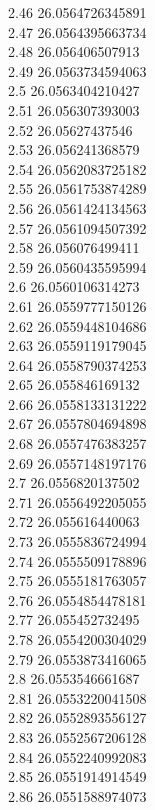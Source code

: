{2.46	26.0564726345891\\
2.47	26.0564395663734\\
2.48	26.056406507913\\
2.49	26.0563734594063\\
2.5	26.0563404210427\\
2.51	26.056307393003\\
2.52	26.05627437546\\
2.53	26.056241368579\\
2.54	26.0562083725182\\
2.55	26.0561753874289\\
2.56	26.0561424134563\\
2.57	26.0561094507392\\
2.58	26.056076499411\\
2.59	26.0560435595994\\
2.6	26.0560106314273\\
2.61	26.0559777150126\\
2.62	26.0559448104686\\
2.63	26.0559119179045\\
2.64	26.0558790374253\\
2.65	26.055846169132\\
2.66	26.0558133131222\\
2.67	26.0557804694898\\
2.68	26.0557476383257\\
2.69	26.0557148197176\\
2.7	26.0556820137502\\
2.71	26.0556492205055\\
2.72	26.055616440063\\
2.73	26.0555836724994\\
2.74	26.0555509178896\\
2.75	26.0555181763057\\
2.76	26.0554854478181\\
2.77	26.055452732495\\
2.78	26.0554200304029\\
2.79	26.0553873416065\\
2.8	26.0553546661687\\
2.81	26.0553220041508\\
2.82	26.0552893556127\\
2.83	26.0552567206128\\
2.84	26.0552240992083\\
2.85	26.0551914914549\\
2.86	26.0551588974073\\
}
